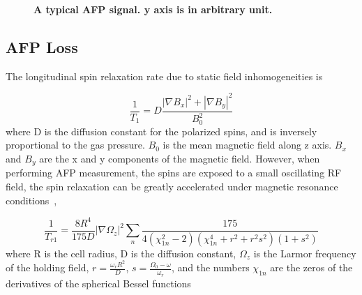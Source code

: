 \begin{figure}[H]\label{AFPSignal}
	\centering
	\caption{{\bf A typical AFP signal. y axis is in arbitrary unit.}}
	\label{AFPSignal}
\end{figure}

\subsection{AFP Loss}

The longitudinal spin relaxation rate due to static field inhomogeneities is~\cite{PhysRev.138.A946, PhysRev.139.A1398, PhysRevA.37.2877}

\begin{equation}
\frac{1}{T_{1}} = D\frac{|\nabla B_{x}|^{2}+|\nabla B_{y}|^{2}}{B_{0}^{2}}
\end{equation}
where D is the diffusion constant for the polarized spins, and is inversely proportional to the gas pressure. $B_{0}$ is the mean magnetic field along z axis. $B_{x}$ and $B_{y}$ are the x and y components of the magnetic field. However, when performing AFP measurement, the spins are exposed to a small oscillating RF field, the spin relaxation can be greatly accelerated under magnetic resonance conditions~\cite{PhysRevA.38.5092},

\begin{equation}
\frac{1}{T_{r1}} = \frac{8R^{4}}{175D}|\nabla \Omega_{z}|^{2}\sum_{n} \frac{175}{4(\chi_{1n}^{2}-2)(\chi_{1n}^{4}+r^{2}+r^{2}s^{2})(1+s^{2})}
\end{equation}
where R is the cell radius, D is the diffusion constant, $\Omega_{z}$ is the Larmor frequency of the holding field, $r=\frac{\omega_{r}R^{2}}{D}$, $s=\frac{\Omega_{0}-\omega}{\omega_{r}}$, and the numbers $\chi_{1n}$ are the zeros of the derivatives of the spherical Bessel functions

